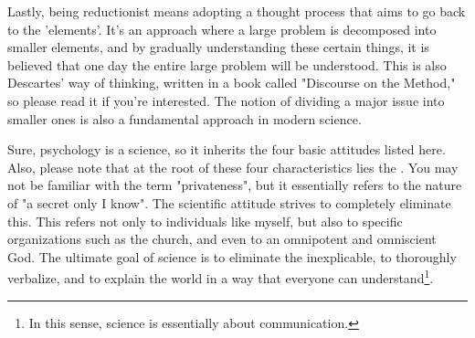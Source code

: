 \documentclass{ltjsbook}
\begin{document}
Lastly, being reductionist means adopting a thought process that aims to go back to the 'elements'. It's an approach where a large problem is decomposed into smaller elements, and by gradually understanding these certain things, it is believed that one day the entire large problem will be understood. This is also Descartes’ way of thinking, written in a book called "Discourse on the Method," so please read it if you're interested. The notion of dividing a major issue into smaller ones is also a fundamental approach in modern science.

Sure, psychology is a science, so it inherits the four basic attitudes listed here. Also, please note that at the root of these four characteristics lies the .
You may not be familiar with the term "privateness", but it essentially refers to the nature of "a secret only I know". The scientific attitude strives to completely eliminate this.
This refers not only to individuals like myself, but also to specific organizations such as the church, and even to an omnipotent and omniscient God.
The ultimate goal of science is to eliminate the inexplicable, to thoroughly verbalize, and to explain the world in a way that everyone can understand\footnote{In this sense, science is essentially about communication.}.
\end{document}
